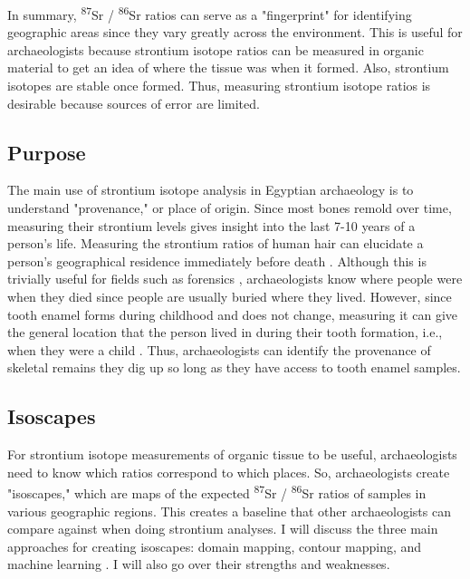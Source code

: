 \documentclass[a4paper, 12pt]{article}
\begin{document}
In summary, \textsuperscript{87}Sr / \textsuperscript{86}Sr ratios can serve as a
"fingerprint" for identifying geographic areas since they vary greatly
across the environment. This is useful for archaeologists because strontium isotope ratios
can be measured in organic material to get an idea of where the tissue was when it formed.
Also, strontium isotopes are stable once formed. Thus, measuring strontium isotope ratios is
desirable because sources of error are limited.


\subsection{Purpose}
The main use of strontium isotope analysis in Egyptian archaeology is to understand
"provenance," or place of origin. Since most bones remold over time, measuring their
strontium levels gives insight into the last 7-10
years of a person's life. Measuring the strontium ratios of human hair can elucidate a person's
geographical residence immediately before death \citep{kamenov2014}. Although this is trivially useful for fields such as forensics \citep{kamenov2014},
archaeologists know where people were when they died
since people are usually buried where they lived. However, since tooth enamel
forms during childhood and does not change, measuring it can give the general location
that the person lived in during their tooth formation, i.e., when they were a child
\citep*{holt2021,kozieradzkaogunmakin2021,lazzerini2021}. Thus, archaeologists can
identify the provenance of skeletal remains they dig up so long as they have access
to tooth enamel samples.

\subsection{Isoscapes}
For strontium isotope measurements of organic tissue to be useful, archaeologists need to know
which ratios correspond to which places.
So, archaeologists create "isoscapes," which are maps of the expected
\textsuperscript{87}Sr / \textsuperscript{86}Sr ratios
of samples in various geographic regions. This creates a baseline that other archaeologists
can compare against when doing strontium analyses. I will discuss the three main approaches
for creating isoscapes: domain mapping,
contour mapping, and machine learning \citep{holt2021}. I will also go over their
strengths and weaknesses.
\end{document}
